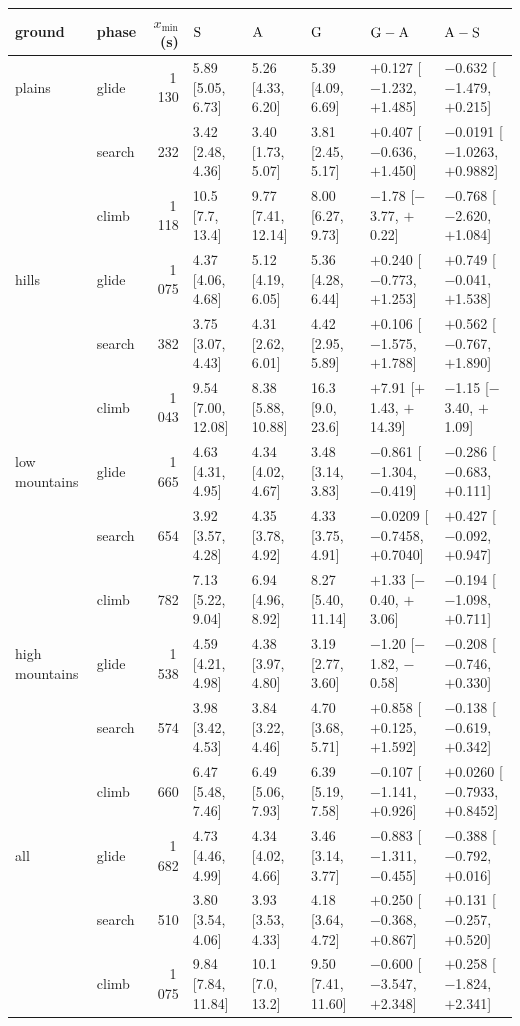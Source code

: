 \begin{tabular}{@{}l l r l l l l l@{}}
\toprule
ground & phase & $x_\mathrm{min}$ (s) & $\mathrm{S}$ & $\mathrm{A}$ & $\mathrm{G}$ & $\mathrm{G}-\mathrm{A}$ & $\mathrm{A}-\mathrm{S}$ \\
\midrule
plains & glide & 1\,130 & 5.89 [5.05, 6.73] & 5.26 [4.33, 6.20] & 5.39 [4.09, 6.69] & $+$0.127 [$-$1.232, $+$1.485] & $-$0.632 [$-$1.479, $+$0.215] \\
 & search & 232 & 3.42 [2.48, 4.36] & 3.40 [1.73, 5.07] & 3.81 [2.45, 5.17] & $+$0.407 [$-$0.636, $+$1.450] & $-$0.0191 [$-$1.0263, $+$0.9882] \\
 & climb & 1\,118 & 10.5 [7.7, 13.4] & 9.77 [7.41, 12.14] & 8.00 [6.27, 9.73] & $-$1.78 [$-$3.77, $+$0.22] & $-$0.768 [$-$2.620, $+$1.084] \\
\addlinespace
hills & glide & 1\,075 & 4.37 [4.06, 4.68] & 5.12 [4.19, 6.05] & 5.36 [4.28, 6.44] & $+$0.240 [$-$0.773, $+$1.253] & $+$0.749 [$-$0.041, $+$1.538] \\
 & search & 382 & 3.75 [3.07, 4.43] & 4.31 [2.62, 6.01] & 4.42 [2.95, 5.89] & $+$0.106 [$-$1.575, $+$1.788] & $+$0.562 [$-$0.767, $+$1.890] \\
 & climb & 1\,043 & 9.54 [7.00, 12.08] & 8.38 [5.88, 10.88] & 16.3 [9.0, 23.6] & $+$7.91 [$+$1.43, $+$14.39] & $-$1.15 [$-$3.40, $+$1.09] \\
\addlinespace
low mountains & glide & 1\,665 & 4.63 [4.31, 4.95] & 4.34 [4.02, 4.67] & 3.48 [3.14, 3.83] & $-$0.861 [$-$1.304, $-$0.419] & $-$0.286 [$-$0.683, $+$0.111] \\
 & search & 654 & 3.92 [3.57, 4.28] & 4.35 [3.78, 4.92] & 4.33 [3.75, 4.91] & $-$0.0209 [$-$0.7458, $+$0.7040] & $+$0.427 [$-$0.092, $+$0.947] \\
 & climb & 782 & 7.13 [5.22, 9.04] & 6.94 [4.96, 8.92] & 8.27 [5.40, 11.14] & $+$1.33 [$-$0.40, $+$3.06] & $-$0.194 [$-$1.098, $+$0.711] \\
\addlinespace
high mountains & glide & 1\,538 & 4.59 [4.21, 4.98] & 4.38 [3.97, 4.80] & 3.19 [2.77, 3.60] & $-$1.20 [$-$1.82, $-$0.58] & $-$0.208 [$-$0.746, $+$0.330] \\
 & search & 574 & 3.98 [3.42, 4.53] & 3.84 [3.22, 4.46] & 4.70 [3.68, 5.71] & $+$0.858 [$+$0.125, $+$1.592] & $-$0.138 [$-$0.619, $+$0.342] \\
 & climb & 660 & 6.47 [5.48, 7.46] & 6.49 [5.06, 7.93] & 6.39 [5.19, 7.58] & $-$0.107 [$-$1.141, $+$0.926] & $+$0.0260 [$-$0.7933, $+$0.8452] \\
\addlinespace
all & glide & 1\,682 & 4.73 [4.46, 4.99] & 4.34 [4.02, 4.66] & 3.46 [3.14, 3.77] & $-$0.883 [$-$1.311, $-$0.455] & $-$0.388 [$-$0.792, $+$0.016] \\
 & search & 510 & 3.80 [3.54, 4.06] & 3.93 [3.53, 4.33] & 4.18 [3.64, 4.72] & $+$0.250 [$-$0.368, $+$0.867] & $+$0.131 [$-$0.257, $+$0.520] \\
 & climb & 1\,075 & 9.84 [7.84, 11.84] & 10.1 [7.0, 13.2] & 9.50 [7.41, 11.60] & $-$0.600 [$-$3.547, $+$2.348] & $+$0.258 [$-$1.824, $+$2.341] \\
\bottomrule
\end{tabular}
